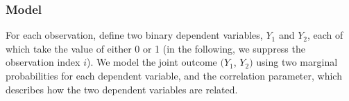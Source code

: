 \documentclass{article}
\begin{document}
\begin{enumerate}
\end{enumerate}

\subsubsection{Model}

For each observation, define two binary dependent variables, $Y_1$ and
$Y_2$, each of which take the value of either 0 or 1 (in the
following, we suppress the observation index $i$).  We model the joint
outcome $(Y_1$, $Y_2)$ using two marginal probabilities for each
dependent variable, and the correlation parameter, which describes how
the two dependent variables are related. 
\end{document}
